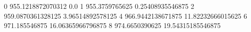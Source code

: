 0 955.1218872070312 0.0
1 955.3759765625 0.25408935546875
2 959.0870361328125 3.96514892578125
4 966.9442138671875 11.82232666015625
6 971.185546875 16.06365966796875
8 974.6650390625 19.54315185546875
